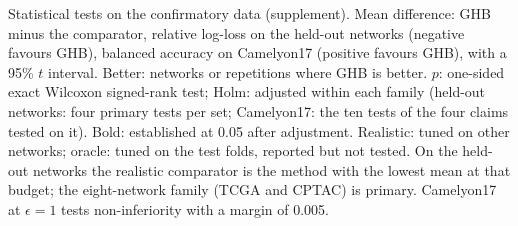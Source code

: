 \begin{table}[t]
\caption{Statistical tests on the confirmatory data (supplement). Mean difference: GHB minus the comparator, relative log-loss on the held-out networks (negative favours GHB), balanced accuracy on Camelyon17 (positive favours GHB), with a 95\% $t$ interval. Better: networks or repetitions where GHB is better. $p$: one-sided exact Wilcoxon signed-rank test; Holm: adjusted within each family (held-out networks: four primary tests per set; Camelyon17: the ten tests of the four claims tested on it). Bold: established at 0.05 after adjustment. Realistic: tuned on other networks; oracle: tuned on the test folds, reported but not tested. On the held-out networks the realistic comparator is the method with the lowest mean at that budget; the eight-network family (TCGA and CPTAC) is primary. Camelyon17 at $\epsilon=1$ tests non-inferiority with a margin of 0.005.}
\label{tab:stats}
\end{table}
